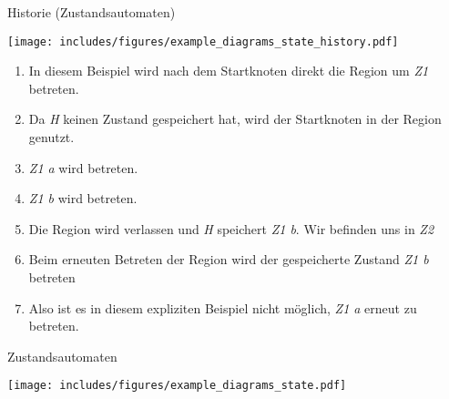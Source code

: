 \begin{example}{Historie (Zustandsautomaten)}
    \begin{center}
        \texttt{[image: includes/figures/example\_diagrams\_state\_history.pdf]}
    \end{center}

    \begin{enumerate}
        \item In diesem Beispiel wird nach dem Startknoten direkt die Region um \emph{Z1} betreten.
        \item  Da \emph{H} keinen Zustand gespeichert hat, wird der Startknoten in der Region genutzt.
        \item \emph{Z1 a} wird betreten.
        \item \emph{Z1 b} wird betreten.
        \item Die Region wird verlassen und \emph{H} speichert \emph{Z1 b}.
              Wir befinden uns in \emph{Z2}
        \item Beim erneuten Betreten der Region wird der gespeicherte Zustand \emph{Z1 b} betreten
        \item Also ist es in diesem expliziten Beispiel nicht möglich, \emph{Z1 a} erneut zu betreten.
    \end{enumerate}
\end{example}

\begin{example}{Zustandsautomaten}
    \begin{center}
        \texttt{[image: includes/figures/example\_diagrams\_state.pdf]}
    \end{center}
\end{example}
